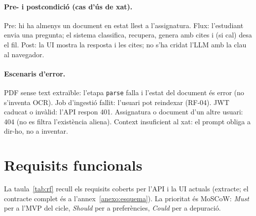 \paragraph{Pre- i postcondició (cas d'ús de xat).}
Pre: hi ha almenys un document en estat llest a l'assignatura. Flux: l'estudiant envia una pregunta; el sistema classifica, recupera, genera amb cites i (si cal) desa el fil. Post: la UI mostra la resposta i les cites; no s'ha cridat l'LLM amb la clau al navegador.

\paragraph{Escenaris d'error.}
PDF sense text extraïble: l'etapa \texttt{parse} falla i l'estat del document és error (no s'inventa OCR). Job d'ingestió fallit: l'usuari pot reindexar (RF-04). JWT caducat o invàlid: l'API respon 401. Assignatura o document d'un altre usuari: 404 (no es filtra l'existència aliena). Context insuficient al xat: el prompt obliga a dir-ho, no a inventar.

\section{Requisits funcionals}

La taula~\ref{tab:rf} recull els requisits coberts per l'API i la UI actuals (extracte; el contracte complet és a l'annex~\ref{anexo:esquema}). La prioritat és MoSCoW: \emph{Must} per a l'MVP del cicle, \emph{Should} per a preferències, \emph{Could} per a depuració.

